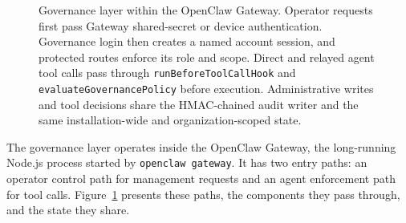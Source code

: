 \begin{figure}[htbp]
{}
\caption[Governance layer within the OpenClaw Gateway]
{\footnotesize Governance layer within the OpenClaw Gateway. Operator requests
first pass Gateway shared-secret or device authentication. Governance login
then creates a named account session, and protected routes enforce its role and
scope. Direct and relayed agent tool calls pass through
\texttt{runBeforeToolCallHook} and \texttt{evaluateGovernancePolicy} before
execution. Administrative writes and tool decisions share the HMAC-chained
audit writer and the same installation-wide and organization-scoped state.}
\label{fig:gov-architecture}
\end{figure}

The governance layer operates inside the OpenClaw Gateway, the long-running
Node.js process started by \texttt{openclaw gateway}. It has two entry paths:
an operator control path for management requests and an agent enforcement path
for tool calls. Figure~\ref{fig:gov-architecture} presents these paths, the
components they pass through, and the state they share.

